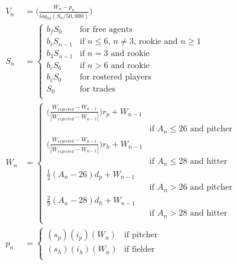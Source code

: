 \documentclass[12pt]{article}
\begin{document}
\begin{equation}
\begin{aligned}
V_n &= \Big(\frac{W_n - p_n}{log_{10}(S_n/50,000)}\Big) \\
S_n &= \begin{cases}
	b_fS_{0} & \text{for free agents} \\
	b_rS_{n-1}  & \text{if $n \leq 6$, $n \neq 3$, rookie and $n \geq 1$} \\
	b_3S_{n-1} & \text{if $n = 3$ and rookie} \\
	b_cS_6 & \text{if $n > 6$ and rookie} \\
	b_cS_0 & \text{for rostered players} \\
	S_0 & \text{for trades}\\                         
  \end{cases} \\
W_n &= \begin{cases}
                                    \Big(\frac{W_{expected} - W_{n-1}}{|W_{expected} - W_{n-1}|}\Big)r_p + W_{n-1}\\ & \text{if $A_n \leq 26$ and pitcher} \\
                                    \Big(\frac{W_{expected} - W_{n-1}}{|W_{expected} - W_{n-1}|}\Big)r_h + W_{n-1}\\ & \text{if $A_n \leq 28$ and hitter} \\
                                    \frac{1}{2}(A_n - 26)d_p + W_{n-1}\\ & \text{if $A_n > 26$ and pitcher} \\
                                    \frac{2}{9}(A_n - 28)d_h + W_{n-1}\\ & \text{if $A_n > 28$ and hitter} \\
  \end{cases} \\
p_n &= \begin{cases}
                                   (s_p)(i_p)(W_{n}) & \text{if pitcher} \\
                                  (s_h)(i_h)(W_{n}) & \text{if fielder} \\
  \end{cases} \\
\end{aligned}
\end{equation}
\end{document}

